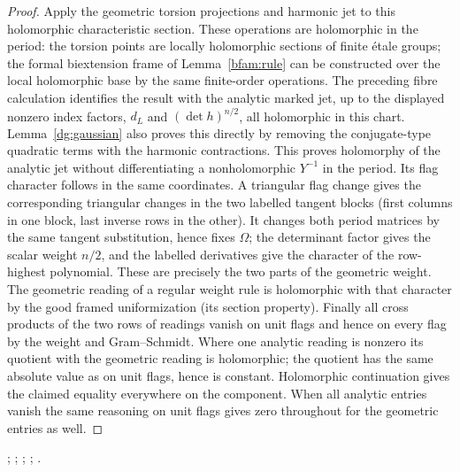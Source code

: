 \begin{proof}
Apply the geometric torsion projections and harmonic jet to this
holomorphic characteristic section. These operations are
holomorphic in the period: the torsion points are locally
holomorphic sections of finite étale groups; the formal
biextension frame of Lemma~\ref{bfam:rule} can be constructed
over the local holomorphic base by the same finite-order
operations. The preceding fibre calculation identifies the
result with the analytic marked jet, up to the displayed
nonzero index factors, \(d_L\) and \((\det h)^{n/2}\), all
holomorphic in this chart. Lemma~\ref{dg:gaussian} also proves
this directly by removing the conjugate-type quadratic terms with
the harmonic contractions. This proves holomorphy of the
analytic jet without differentiating a nonholomorphic
\(Y^{-1}\) in the period. Its flag character follows in the
same coordinates. A triangular flag change gives the corresponding
triangular changes in the two labelled tangent blocks (first
columns in one block, last inverse rows in the other). It changes
both period matrices by the same tangent substitution, hence
fixes \(\Omega\); the determinant factor gives the scalar
weight \(n/2\), and the labelled derivatives give the character
of the row-highest polynomial. These are precisely the two parts
of the geometric weight. The geometric reading of a regular
weight rule is holomorphic with that character by the good framed
uniformization (its section property).
Finally all
cross products of the two rows of readings vanish on unit flags
and hence on every flag by the weight and Gram--Schmidt. Where
one analytic reading is nonzero its quotient with the geometric
reading is holomorphic; the quotient has the same absolute value
as on unit flags, hence is constant. Holomorphic continuation
gives the claimed equality everywhere on the component. When
all analytic entries vanish the same reasoning on unit flags
gives zero throughout for the geometric entries as well.
\end{proof}
;
;
;
;
.


